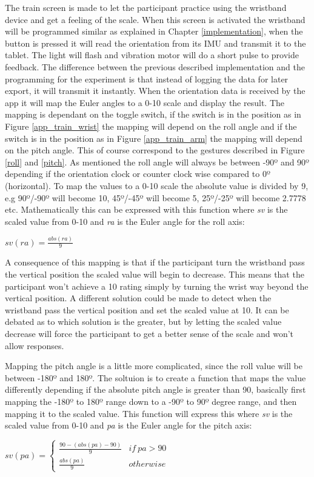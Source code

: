 The train screen is made to let the participant practice using the wristband device and get a feeling of the scale. When this screen is activated the wristband will be programmed similar as explained in Chapter \ref{implementation}, when the button is pressed it will read the orientation from its IMU and transmit it to the tablet. The light will flash and vibration motor will do a short pulse to provide feedback. The difference between the previous described implementation and the programming for the experiment is that instead of logging the data for later export, it will transmit it instantly. When the orientation data is received by the app it will map the Euler angles to a 0-10 scale and display the result. The mapping is dependant on the toggle switch, if the switch is in the  position as in Figure \ref{app_train_wrist} the mapping will depend on the roll angle and if the switch is in the  position as in Figure \ref{app_train_arm} the mapping will depend on the pitch angle. This of course correspond to the gestures described in Figure \ref{roll} and \ref{pitch}. As mentioned the roll angle will always be between -90º and 90º depending if the orientation clock or counter clock wise compared to 0º (horizontal). To map the values to a 0-10 scale the absolute value is divided by 9, e.g 90º/-90º will become 10, 45º/-45º will become 5, 25º/-25º will become 2.7778 etc. Mathematically this can be expressed with this function where \emph{sv} is the scaled value from 0-10 and \emph{ra} is the Euler angle for the roll axis:
\begin{center}
$sv\left ( ra \right ) = \frac{abs\left (ra\right )}{9}$
\end{center}

A consequence of this mapping is that if the participant turn the wristband pass the vertical position the scaled value will begin to decrease. This means that the participant won't achieve a 10 rating simply by turning the wrist way beyond the vertical position. A different solution could be made to detect when the wristband pass the vertical position and set the scaled value at 10. It can be debated as to which solution is the greater, but by letting the scaled value decrease will force the participant to get a better sense of the scale and won't allow  responses.

Mapping the pitch angle is a little more complicated, since the roll value will be between -180º and 180º. The soltuion is to create a function that maps the value differently depending if the absolute pitch angle is greater than 90, basically first mapping the -180º to 180º range down to a -90º to 90º degree range, and then mapping it to the scaled value. This function will express this where \emph{sv} is the scaled value from 0-10 and \emph{pa} is the Euler angle for the pitch axis:
\begin{center}
$sv\left ( pa \right ) = \left\{\begin{matrix}
\frac{90-\left ( abs\left ( pa \right )-90 \right )}{9} & if\ pa> 90 \\ 
\frac{abs\left ( pa \right )}{9} & otherwise
\end{matrix}\right.$
\end{center}

